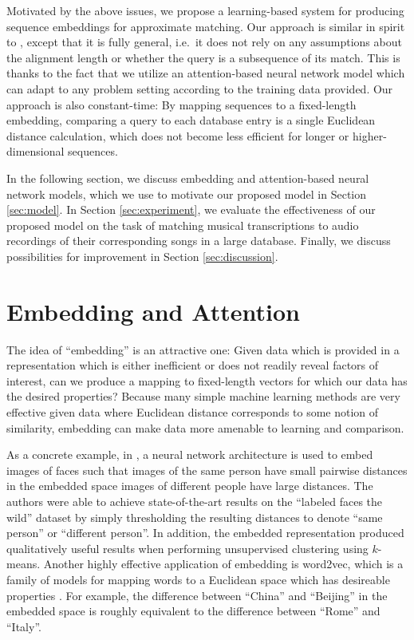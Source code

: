 \documentclass{article}
\begin{document}
Motivated by the above issues, we propose a learning-based system for producing sequence embeddings for approximate matching.
Our approach is similar in spirit to \cite{papapetrou2011embedding}, except that it is fully general, i.e.\ it does not rely on any assumptions about the alignment length or whether the query is a subsequence of its match.
This is thanks to the fact that we utilize an attention-based neural network model which can adapt to any problem setting according to the training data provided.
Our approach is also constant-time: By mapping sequences to a fixed-length embedding, comparing a query to each database entry is a single Euclidean distance calculation, which does not become less efficient for longer or higher-dimensional sequences.

In the following section, we discuss embedding and attention-based neural network models, which we use to motivate our proposed model in Section \ref{sec:model}.
In Section \ref{sec:experiment}, we evaluate the effectiveness of our proposed model on the task of matching musical transcriptions to audio recordings of their corresponding songs in a large database.
Finally, we discuss possibilities for improvement in Section \ref{sec:discussion}.

\section{Embedding and Attention}
\label{sec:embedding}

The idea of ``embedding'' is an attractive one: Given data which is provided in a representation which is either inefficient or does not readily reveal factors of interest, can we produce a mapping to fixed-length vectors for which our data has the desired properties?
Because many simple machine learning methods are very effective given data where Euclidean distance corresponds to some notion of similarity, embedding can make data more amenable to learning and comparison.

As a concrete example, in \cite{schroff2015facenet}, a neural network architecture is used to embed images of faces such that images of the same person have small pairwise distances in the embedded space images of different people have large distances.
The authors were able to achieve state-of-the-art results on the ``labeled faces the wild'' dataset by simply thresholding the resulting distances to denote ``same person'' or ``different person''.
In addition, the embedded representation produced qualitatively useful results when performing unsupervised clustering using $k$-means.
Another highly effective application of embedding is word2vec, which is a family of models for mapping words to a Euclidean space which has desireable properties \cite{mikolov2013distributed}.
For example, the difference between ``China'' and ``Beijing'' in the embedded space is roughly equivalent to the difference between ``Rome'' and ``Italy''.
\end{document}
